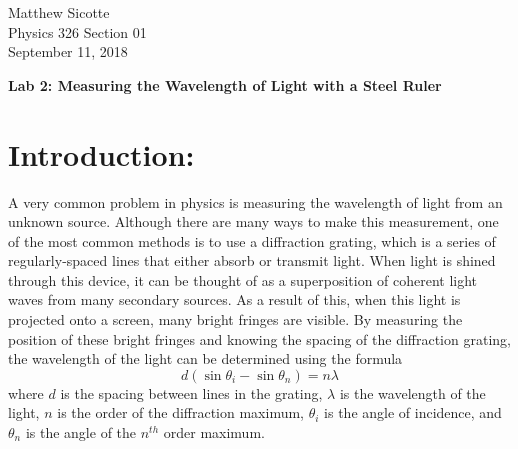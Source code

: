 \documentclass[leqno]{article}
\begin{document}
\begin{flushright}
Matthew Sicotte\\
Physics 326 Section 01\\
September 11, 2018
\end{flushright}
\begin{center}
	{\large \bf Lab 2: Measuring the Wavelength of Light with a Steel Ruler}
\end{center}
\section*{Introduction:}
A very common problem in physics is measuring the wavelength of light from an unknown source.  Although there are many ways to make this measurement, one of the most common methods is to use a diffraction grating, which is a series of regularly-spaced lines that either absorb or transmit light.  When light is shined through this device, it can be thought of as a superposition of coherent light waves from many secondary sources.  As a result of this, when this light is projected onto a screen, many bright fringes are visible.  By measuring the position of these bright fringes and knowing the spacing of the diffraction grating, the wavelength of the light can be determined using the formula
\begin{equation}
	d(\sin{\theta_i}-\sin{\theta_n})=n\lambda
\end{equation}
where $d$ is the spacing between lines in the grating, $\lambda$ is the wavelength of the light, $n$ is the order of the diffraction maximum, $\theta_i$ is the angle of incidence, and $\theta_n$ is the angle of the $n^{th}$ order maximum.\\

\noindent 
\end{document}
